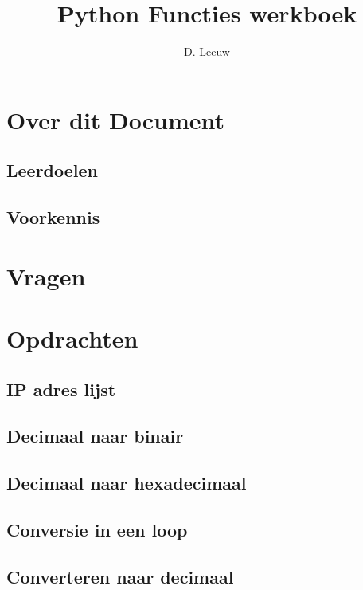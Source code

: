 \documentclass[a4paper,12pt,twoside,openright,titlepage]{article}
\author{D. Leeuw}
\title{Python Functies werkboek}
\date{\today\\
1.0.0\\
\vfill
\raggedright
\copyright\ 2025 Dennis Leeuw\\
}
\begin{document}

\maketitle


\section{Over dit Document}
\subsection{Leerdoelen}

\subsection{Voorkennis}



\section{Vragen}


\section{Opdrachten}
\subsection{IP adres lijst}


\subsection{Decimaal naar binair}


\subsection{Decimaal naar hexadecimaal}


\subsection{Conversie in een loop}


\subsection{Converteren naar decimaal}



\printindex
\end{document}
